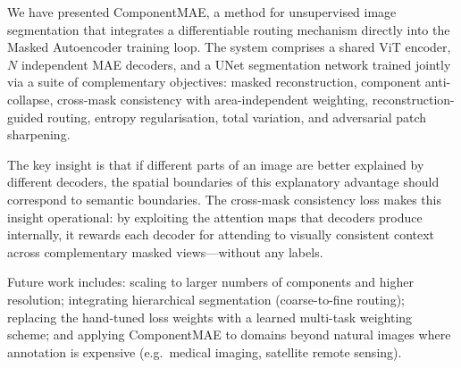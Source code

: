 \documentclass{article}
\begin{document}
We have presented ComponentMAE, a method for unsupervised image segmentation that
integrates a differentiable routing mechanism directly into the Masked Autoencoder
training loop.  The system comprises a shared ViT encoder, $N$ independent MAE
decoders, and a UNet segmentation network trained jointly via a suite of
complementary objectives: masked reconstruction, component anti-collapse,
cross-mask consistency with area-independent weighting, reconstruction-guided
routing, entropy regularisation, total variation, and adversarial patch sharpening.

The key insight is that if different parts of an image are better explained by
different decoders, the spatial boundaries of this explanatory advantage should
correspond to semantic boundaries.  The cross-mask consistency loss makes this
insight operational: by exploiting the attention maps that decoders produce
internally, it rewards each decoder for attending to visually consistent context
across complementary masked views---without any labels.

Future work includes: scaling to larger numbers of components and higher resolution;
integrating hierarchical segmentation (coarse-to-fine routing); replacing the
hand-tuned loss weights with a learned multi-task weighting scheme; and applying
ComponentMAE to domains beyond natural images where annotation is expensive (e.g.\
medical imaging, satellite remote sensing).



\end{document}

